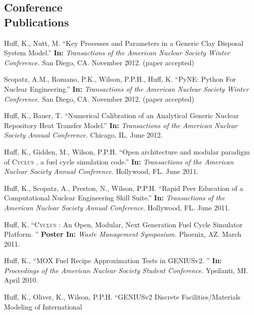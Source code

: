 \documentclass[margin,line]{resume}
\newcommand{\Cyclus}{\textsc{Cyclus }}
\begin{document}
\begin{resume}
    \section{\mysidestyle Conference\\Publications}
    \begin{bibenum}
      \item Huff, K., Nutt, M. ``Key Processes and Parameters in a Generic Clay Disposal System Model.''
        \textbf{In: } \emph{Transactions of the American Nuclear Society Winter Conference.} 
        San Diego, CA. November 2012. (paper accepted)
      \item Scopatz, A.M., Romano, P.K., Wilson, P.P.H., Huff, K. ``PyNE: Python For Nuclear Engineering.''
        \textbf{In: } \emph{Transactions of the American Nuclear Society Winter Conference.} 
        San Diego, CA. November 2012. (paper accepted)
      \item Huff, K., Bauer, T. ``Numerical Calibration of an Analytical Generic Nuclear Repository Heat Transfer Model.''
        \textbf{In: } \emph{Transactions of the American Nuclear Society Annual Conference.} 
        Chicago, IL. June 2012.
      \item Huff, K., Gidden, M., Wilson, P.P.H. ``Open architecture and modular paradigm of \Cyclus, a fuel cycle simulation code.''
        \textbf{In: } \emph{Transactions of the American Nuclear Society Annual Conference.} 
        Hollywood, FL. June 2011.
      \item Huff, K., Scopatz, A., Preston, N., Wilson, P.P.H. ``Rapid Peer Education of a Computational Nuclear Engineering Skill Suite.'' 
        \textbf{In: } \emph{Transactions of the American Nuclear Society Annual Conference.} 
        Hollywood, FL. June 2011.
      \item Huff, K. ``\Cyclus: An Open, Modular, Next Generation Fuel Cycle Simulator Platform. ''
        \textbf{Poster In: } \emph{Waste Management Symposium.} Phoenix, AZ. March 
        2011.
      \item Huff, K., ``MOX Fuel Recipe Approximation Tests in GENIUSv2. ''
        \textbf{In: } \emph{Proceedings of the American Nuclear Society Student Conference.} 
        Ypsilanti, MI. April 2010.
      \item Huff, K., Oliver, K., Wilson, P.P.H. ``GENIUSv2 Discrete Facilities/Materials Modeling of International 

\end{bibenum}
\end{resume}
\end{document}
